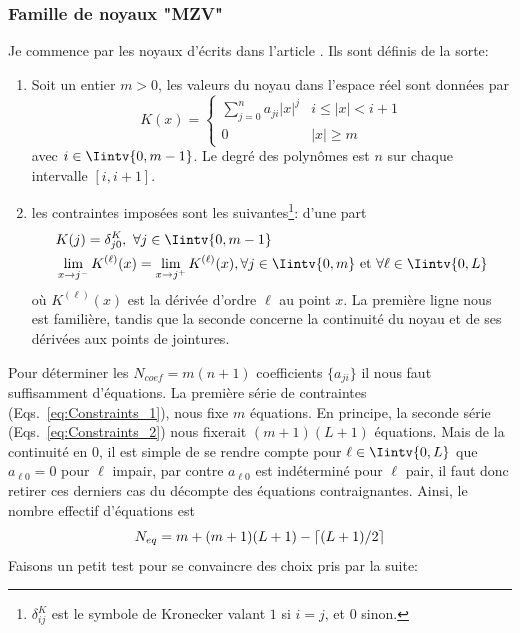 \documentclass[11pt,twoside]{article}
\DeclarePairedDelimiter\ceil{\lceil}{\rceil}
\begin{document}
\subsubsection{Famille de noyaux "MZV"}
\label{sec:MZVkernels}
%
Je commence par les noyaux d'écrits dans l'article \cite{Meijering1999}. Ils sont définis de la sorte:
\begin{enumerate}
\item Soit un entier $m>0$, les valeurs du noyau dans l'espace réel sont données par
\begin{equation}
K(x) =\begin{cases}
\sum_{j=0}^n a_{ji} |x|^{j} & i\leq |x| < i+1 \\
0 & |x|\geq m
\end{cases}
\end{equation}
avec  $i\in \Iintv{0,m-1}$. Le degré des polynômes est $n$ sur chaque intervalle $[i,i+1]$.
\item les contraintes imposées sont les suivantes\footnote{$\delta^K_{ij}$ est le symbole de Kronecker valant $1$ si $i=j$, et $0$ sinon.}: d'une part
\begin{align}
&K(j) = \delta^K_{j0},\ \forall j\in \Iintv{0,m-1} \label{eq:Constraints_1}\\
&\lim_{x\rightarrow j^{-}}K^{(\ell)}(x) = \lim_{x\rightarrow j^{+}}K^{(\ell)}(x), \forall j\in \Iintv{0,m} \ \mathrm{et}\ \forall \ell \in  \Iintv{0,L} \label{eq:Constraints_2}
\end{align} 
où $K^{(\ell)}(x)$ est la dérivée d'ordre $\ell$ au point $x$. La première ligne nous est familière, tandis que la seconde concerne la continuité du noyau et de ses dérivées aux points de jointures.
\end{enumerate}
Pour déterminer les $N_{coef}=m(n+1)$ coefficients $\{a_{ji}\}$ il nous faut suffisamment d'équations. La première série de contraintes (Eqs.~\ref{eq:Constraints_1}), nous fixe $m$ équations.  En principe, la seconde série (Eqs.~\ref{eq:Constraints_2}) nous fixerait $(m+1)(L+1)$ équations. Mais de la  continuité en $0$, il est simple de se rendre compte  pour $\ell \in  \Iintv{0,L}$ que $a_{\ell 0}=0$ pour $\ell$ impair, par contre $a_{\ell 0}$ est indéterminé pour $\ell$ pair, il faut donc retirer ces derniers cas du décompte des équations contraignantes. Ainsi, le nombre effectif d'équations est 
\begin{equation}
N_{eq} = m +  (m+1)(L+1) - \ceil{(L+1)/2}
\end{equation}
Faisons un petit test pour se convaincre des choix pris par la suite:
\end{document}
